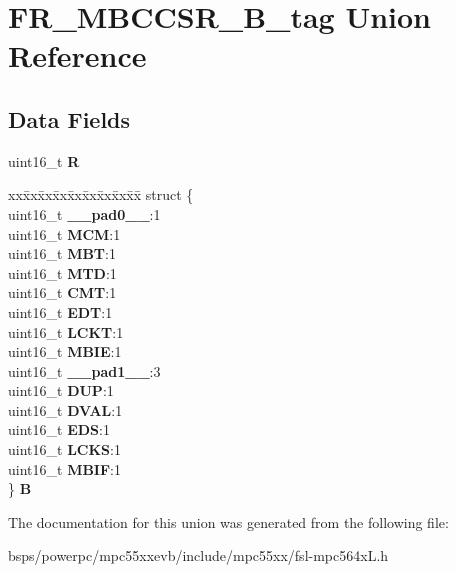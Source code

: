 \hypertarget{unionFR__MBCCSR__16B__tag}{}\section{F\+R\+\_\+\+M\+B\+C\+C\+S\+R\+\_\+B\+\_\+tag Union Reference}
\label{unionFR__MBCCSR__16B__tag}
\subsection*{Data Fields}
\begin{DoxyCompactItemize}
\item 
\mbox{\label{unionFR__MBCCSR__16B__tag_a5d715e142d23f1e94c3260304c0823fd}} 
uint16\+\_\+t {\bfseries R}
\item 
\mbox{\label{unionFR__MBCCSR__16B__tag_ad8a90db8ffce7e5d512430202da7496d}} 
\begin{tabbing}
xx\=xx\=xx\=xx\=xx\=xx\=xx\=xx\=xx\=\kill
struct \{\\
\>uint16\_t {\bfseries \_\_pad0\_\_}:1\\
\>uint16\_t {\bfseries MCM}:1\\
\>uint16\_t {\bfseries MBT}:1\\
\>uint16\_t {\bfseries MTD}:1\\
\>uint16\_t {\bfseries CMT}:1\\
\>uint16\_t {\bfseries EDT}:1\\
\>uint16\_t {\bfseries LCKT}:1\\
\>uint16\_t {\bfseries MBIE}:1\\
\>uint16\_t {\bfseries \_\_pad1\_\_}:3\\
\>uint16\_t {\bfseries DUP}:1\\
\>uint16\_t {\bfseries DVAL}:1\\
\>uint16\_t {\bfseries EDS}:1\\
\>uint16\_t {\bfseries LCKS}:1\\
\>uint16\_t {\bfseries MBIF}:1\\
\} {\bfseries B}\\

\end{tabbing}\end{DoxyCompactItemize}


The documentation for this union was generated from the following file\+:\begin{DoxyCompactItemize}
\item 
bsps/powerpc/mpc55xxevb/include/mpc55xx/fsl-\/mpc564x\+L.\+h\end{DoxyCompactItemize}
